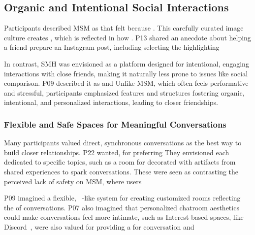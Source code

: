 \subsection{Organic and Intentional Social Interactions}
\label{lab:4-2}
Participants described MSM as  that felt  because . This carefully curated image culture creates , which is reflected in how . P13 shared an anecdote about helping a friend prepare an Instagram post, including selecting the  highlighting 

In contrast, SMH was envisioned as a platform designed for intentional, engaging interactions with close friends, making it naturally less prone to issues like social comparison. P09 described it as      and  Unlike MSM, which often feels performative and stressful, participants emphasized features and structures fostering organic, intentional, and personalized interactions, leading to closer friendships.

\subsubsection{Flexible and Safe Spaces for Meaningful Conversations}
\label{lab:4-2-1}
Many participants valued direct, synchronous conversations as the best way to build closer relationships. P22 wanted,  for  preferring  They envisioned  each dedicated to specific topics, such as a room for  decorated with artifacts from shared experiences to spark conversations. These were seen as contrasting the perceived lack of safety on MSM, where users

P09 imagined a flexible, ~\cite{room-of-requirement}-like system for creating customized rooms  reflecting the  of conversations. P07 also imagined that personalized chatroom aesthetics could make conversations feel more intimate, such as Interest-based spaces, like Discord~\cite{discord}, were also valued for providing a for conversation and 


